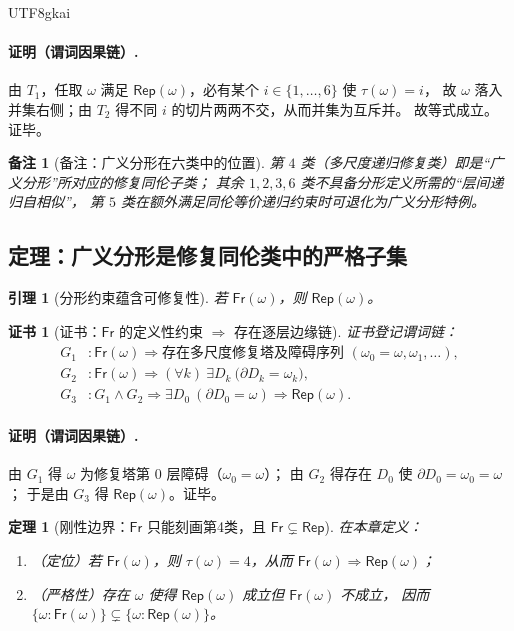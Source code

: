 \documentclass[12pt]{article}
\newtheorem{theorem}{定理}[section]
\newtheorem{lemma}{引理}[section]
\newtheorem{remark}{备注}[section]
\newtheorem{Certificate}{证书}[section]
\newcommand{\KouJing}{\texorpdfstring{表述约定}{表述约定}}
\begin{document}
\begin{CJK*}{UTF8}{gkai}
\paragraph{证明（谓词因果链）.}
由 $T_1$，任取 $\omega$ 满足 $\mathsf{Rep}(\omega)$，必有某个 $i\in\{1,\dots,6\}$ 使 $\tau(\omega)=i$，
故 $\omega$ 落入并集右侧；由 $T_2$ 得不同 $i$ 的切片两两不交，从而并集为互斥并。
故等式成立。证毕。

\begin{remark}[备注：广义分形在六类中的位置]
第 $4$ 类（多尺度递归修复类）即是“广义分形”所对应的修复同伦子类；
其余 $1,2,3,6$ 类不具备分形定义所需的“层间递归自相似”，
第 $5$ 类在额外满足同伦等价递归约束时可退化为广义分形特例。
\end{remark}

\subsection{定理：广义分形是修复同伦类中的严格子集}
\label{subsec:tex29-fractal-boundary}

\begin{lemma}[分形约束蕴含可修复性]
\label{lem:tex29-fractal-implies-repairable}
若 $\mathsf{Fr}(\omega)$，则 $\mathsf{Rep}(\omega)$。
\end{lemma}

\begin{Certificate}[证书：$\mathsf{Fr}$ 的定义性约束 $\Rightarrow$ 存在逐层边缘链]
\label{cert:tex29-fractal-implies-repairable}
证书登记谓词链：
\[
\begin{aligned}
  G_1 &: \mathsf{Fr}(\omega)\Rightarrow \text{存在多尺度修复塔及障碍序列 }(\omega_0=\omega,\omega_1,\dots),\\
  G_2 &: \mathsf{Fr}(\omega)\Rightarrow (\forall k)\ \exists D_k\ \bigl(\partial D_k=\omega_k\bigr),\\
  G_3 &: G_1\wedge G_2\Rightarrow \exists D_0\ (\partial D_0=\omega)\Rightarrow \mathsf{Rep}(\omega).
\end{aligned}
\]
\end{Certificate}

\paragraph{证明（谓词因果链）.}
由 $G_1$ 得 $\omega$ 为修复塔第 $0$ 层障碍（$\omega_0=\omega$）；
由 $G_2$ 得存在 $D_0$ 使 $\partial D_0=\omega_0=\omega$；
于是由 $G_3$ 得 $\mathsf{Rep}(\omega)$。证毕。

\begin{theorem}[刚性边界：$\mathsf{Fr}$ 只能刻画第4类，且 $\mathsf{Fr}\subsetneq \mathsf{Rep}$]
\label{thm:tex29-fractal-strict-subset}
在本章定义：
\begin{enumerate}
  \item （定位）若 $\mathsf{Fr}(\omega)$，则 $\tau(\omega)=4$，从而 $\mathsf{Fr}(\omega)\Rightarrow \mathsf{Rep}(\omega)$；
  \item （严格性）存在 $\omega$ 使得 $\mathsf{Rep}(\omega)$ 成立但 $\mathsf{Fr}(\omega)$ 不成立，
  因而 $\{\omega:\mathsf{Fr}(\omega)\}\subsetneq \{\omega:\mathsf{Rep}(\omega)\}$。
\end{enumerate}
\end{theorem}


\end{CJK*}
\end{document}
